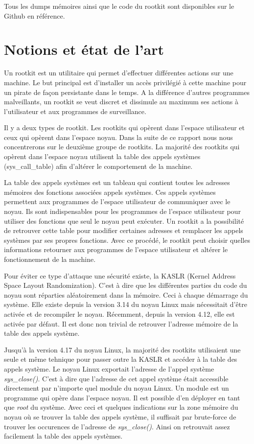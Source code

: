 \documentclass[journal, a4paper]{IEEEtran}
\begin{document}
Tous les dumps mémoires ainsi que le code du rootkit sont disponibles sur le Github en référence.

\section{Notions et état de l'art}

Un rootkit est un utilitaire qui permet d'effectuer différentes actions sur une machine. Le but principal est d'installer un accès privilégié à cette machine pour un pirate de façon persistante dans le temps. A la différence d'autres programmes malveillants, un rootkit se veut discret et dissimule au maximum ses actions à l'utilisateur et aux programmes de surveillance.

Il y a deux types de rootkit. Les rootkits qui opèrent dans l'espace utilisateur et ceux qui opèrent dans l'espace noyau. Dans la suite de ce rapport nous nous concentrerons sur le deuxième groupe de rootkits. La majorité des rootkits qui opèrent dans l'espace noyau utilisent la table des appels systèmes (sys\_call\_table) afin d'altérer le comportement de la machine.

La table des appels systèmes est un tableau qui contient toutes les adresses mémoires des fonctions associées appels systèmes. Ces appels systèmes permettent aux programmes de l'espace utilisateur de communiquer avec le noyau. Ils sont indispensables pour les programmes de l'espace utilisateur pour utiliser des fonctions que seul le noyau peut exécuter. Un rootkit a la possibilité de retrouver cette table pour modifier certaines adresses et remplacer les appels systèmes par ses propres fonctions. Avec ce procédé, le rootkit peut choisir quelles informations retourner aux programmes de l'espace utilisateur et altérer le fonctionnement de la machine.

Pour éviter ce type d'attaque une sécurité existe, la  KASLR (Kernel Address Space Layout Randomization). C'est à dire que les différentes parties du code du noyau sont réparties aléatoirement dans la mémoire. Ceci à chaque démarrage du système. Elle existe depuis la version 3.14 du noyau Linux mais nécessitait d'être activée et de recompiler le noyau. Récemment, depuis la version 4.12, elle est activée par défaut. Il est donc non trivial de retrouver l'adresse mémoire de la table des appels système.

Jusqu'à la version 4.17 du noyau Linux, la majorité des rootkits utilisaient une seule et même tehnique pour passer outre la KASLR et accéder à la table des appels système. Le noyau Linux exportait l'adresse de l'appel système \textit{sys\_close()}. C'est à dire que l'adresse de cet appel système était accessible directement par n'importe quel module du noyau Linux. Un module est un programme qui opère dans l'espace noyau. Il est possible d'en déployer en tant que \textit{root} du système. Avec ceci et quelques indications sur la zone mémoire du noyau où se trouver la table des appels système, il suffisait par brute-force de trouver les occurences de l'adresse de \textit{sys\_close()}. Ainsi on retrouvait assez facilement la table des appels systèmes.
\end{document}
